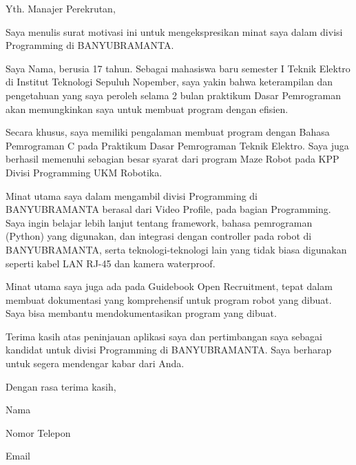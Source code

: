 \documentclass{article}
\begin{document}
\par{Yth. Manajer Perekrutan,}
\par\null\par
\par{Saya menulis surat motivasi ini untuk mengekspresikan minat saya dalam divisi Programming di BANYUBRAMANTA.}
\par\null\par
\par{Saya Nama, berusia 17 tahun. Sebagai mahasiswa baru semester I Teknik Elektro di Institut Teknologi Sepuluh Nopember, saya yakin bahwa keterampilan dan pengetahuan yang saya peroleh selama 2 bulan praktikum Dasar Pemrograman akan memungkinkan saya untuk membuat program dengan efisien.}
\par\null\par
\par{Secara khusus, saya memiliki pengalaman membuat program dengan Bahasa Pemrograman C pada Praktikum Dasar Pemrograman Teknik Elektro. Saya juga berhasil memenuhi sebagian besar syarat dari program Maze Robot pada KPP Divisi Programming UKM Robotika.}
\par\null\par
\par{Minat utama saya dalam mengambil divisi Programming di BANYUBRAMANTA berasal dari Video Profile, pada bagian Programming. Saya ingin belajar lebih lanjut tentang framework, bahasa pemrograman (Python) yang digunakan, dan integrasi dengan controller pada robot di BANYUBRAMANTA, serta teknologi-teknologi lain yang tidak biasa digunakan seperti kabel LAN RJ-45 dan kamera waterproof.}
\par\null\par
\par{Minat utama saya juga ada pada Guidebook Open Recruitment, tepat dalam membuat dokumentasi yang komprehensif untuk program robot yang dibuat. Saya bisa membantu mendokumentasikan program yang dibuat.}
\par\null\par
\par{Terima kasih atas peninjauan aplikasi saya dan pertimbangan saya sebagai kandidat untuk divisi Programming di BANYUBRAMANTA. Saya berharap untuk segera mendengar kabar dari Anda.}
\par\null\par
\par{Dengan rasa terima kasih,}
\par{Nama}
\par{Nomor Telepon}
\par{Email}
\end{document}
